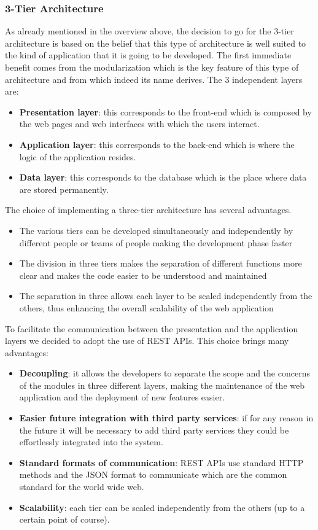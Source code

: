 \subsubsection{3-Tier Architecture}
As already mentioned in the overview above, the decision to go for the 3-tier architecture is based on the belief that this type of architecture is well suited to the kind of application that it is going to be developed.
The first immediate benefit comes from the modularization which is the key feature of this type of architecture and from which indeed its name derives. The 3 independent layers are: 
\begin{itemize}
    \item \textbf{Presentation layer}: this corresponds to the front-end which is composed by the web pages and web interfaces with which the users interact.
    \item \textbf{Application layer}: this corresponds to the back-end which is where the logic of the application resides. 
    \item \textbf{Data layer}: this corresponds to the database which is the place where data are stored permanently.
\end{itemize}
The choice of implementing a three-tier architecture has several advantages.
\begin{itemize}
    \item The various tiers can be developed simultaneously and independently by different people or teams of people making the development phase faster
    \item The division in three tiers makes the separation of different functions more clear and makes the code easier to be understood and maintained
    \item The separation in three allows each layer to be scaled independently from the others, thus enhancing the overall scalability of the web application
\end{itemize}
To facilitate the communication between the presentation  and the application layers we decided to adopt the use of REST APIs. This choice brings many advantages:
\begin{itemize}
    \item \textbf{Decoupling}: it allows the developers to separate the scope and the concerns of the modules in three different layers, making the maintenance of the web application and the deployment of new features easier.
    \item \textbf{Easier future integration with third party services}: if for any reason in the future it will be necessary to add third party services they could be  effortlessly integrated into the system. 
    \item \textbf{Standard formats of communication}: REST APIs use standard HTTP methods and the JSON format to communicate which are the common standard for the world wide web.
    \item \textbf{Scalability}: each tier can be scaled independently from the others (up to a certain point of course).
\end{itemize}

